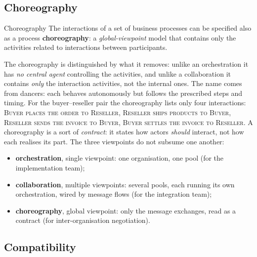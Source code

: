 \subsection{Choreography}

\begin{definitionbox}{Choreography}
The interactions of a set of business processes can be specified also as a process \textbf{choreography}: a \emph{global-viewpoint} model that contains only the activities related to interactions between participants.
\end{definitionbox}

The choreography is distinguished by what it removes: unlike an orchestration it has \emph{no central agent} controlling the activities, and unlike a collaboration it contains \emph{only} the interaction activities, not the internal ones. The name comes from dancers: each behaves autonomously but follows the prescribed steps and timing. For the buyer--reseller pair the choreography lists only four interactions: \textsc{Buyer places the order to Reseller}, \textsc{Reseller ships products to Buyer}, \textsc{Reseller sends the invoice to Buyer}, \textsc{Buyer settles the invoice to Reseller}. A choreography is a sort of \emph{contract}: it states how actors \emph{should} interact, not how each realises its part. The three viewpoints do not subsume one another:
\begin{itemize}
  \item \textbf{orchestration}, single viewpoint: one organisation, one pool (for the implementation team);
  \item \textbf{collaboration}, multiple viewpoints: several pools, each running its own orchestration, wired by message flows (for the integration team);
  \item \textbf{choreography}, global viewpoint: only the message exchanges, read as a contract (for inter-organisation negotiation).
\end{itemize}

\subsection{Compatibility}

